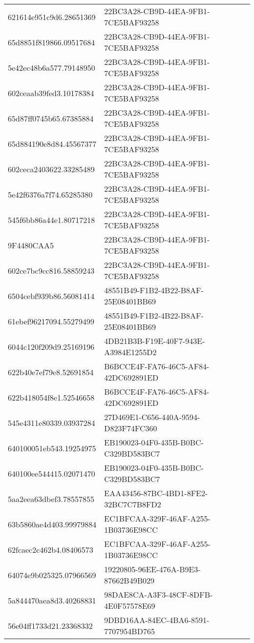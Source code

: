 \begin{tabular}{ll}
621614e951c9d6.28651369 & 22BC3A28-CB9D-44EA-9FB1-7CE5BAF93258 \\
65d8851f819866.09517684 & 22BC3A28-CB9D-44EA-9FB1-7CE5BAF93258 \\
5e42ec48b6a577.79148950 & 22BC3A28-CB9D-44EA-9FB1-7CE5BAF93258 \\
602ceaab39fed3.10178384 & 22BC3A28-CB9D-44EA-9FB1-7CE5BAF93258 \\
65d87ff0745b65.67385884 & 22BC3A28-CB9D-44EA-9FB1-7CE5BAF93258 \\
65d884190e8d84.45567377 & 22BC3A28-CB9D-44EA-9FB1-7CE5BAF93258 \\
602ceca2403622.33285489 & 22BC3A28-CB9D-44EA-9FB1-7CE5BAF93258 \\
5e42f6376a7f74.65285380 & 22BC3A28-CB9D-44EA-9FB1-7CE5BAF93258 \\
545f6bb86a44e1.80717218 & 22BC3A28-CB9D-44EA-9FB1-7CE5BAF93258 \\
9F4480CAA5 & 22BC3A28-CB9D-44EA-9FB1-7CE5BAF93258 \\
602ce7bc9cc816.58859243 & 22BC3A28-CB9D-44EA-9FB1-7CE5BAF93258 \\
6504cebf939b86.56081414 & 48551B49-F1B2-4B22-B8AF-25E08401BB69 \\
61ebef96217094.55279499 & 48551B49-F1B2-4B22-B8AF-25E08401BB69 \\
6044c120f209d9.25169196 & 4DB21B3B-F19E-40F7-943E-A3984E1255D2 \\
622b40e7ef79e8.52691854 & B6BCCE4F-FA76-46C5-AF84-42DC692891ED \\
622b418054f8e1.52546658 & B6BCCE4F-FA76-46C5-AF84-42DC692891ED \\
545e4311e80339.03937284 & 27D469E1-C656-440A-9594-D823F74FC360 \\
640100051eb543.19254975 & EB190023-04F0-435B-B0BC-C329BD583BC7 \\
640100ee544415.02071470 & EB190023-04F0-435B-B0BC-C329BD583BC7 \\
5aa2eea63dbef3.78557855 & EAA43456-87BC-4BD1-8FE2-32BC7C7B8FD2 \\
63b5860ae4d403.99979884 & EC1BFCAA-329F-46AF-A255-1B03736E98CC \\
62fcaec2c462b4.08406573 & EC1BFCAA-329F-46AF-A255-1B03736E98CC \\
64074e9b025325.07966569 & 19220805-96EE-476A-B9E3-87662B49B029 \\
5a844470aea8d3.40268831 & 98DAE8CA-A3F3-48CF-8DFB-4E0F57578E69 \\
56e04ff1733d21.23368332 & 9DBD16AA-84EC-4BA6-8591-7707954BD765 \\

\end{tabular}
